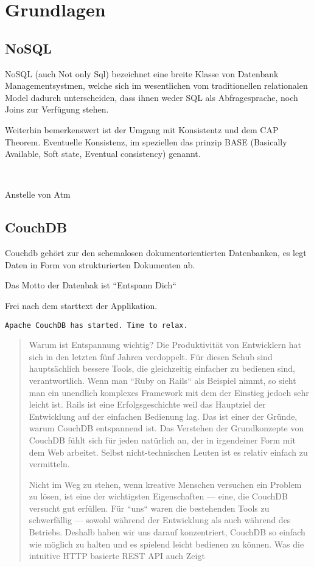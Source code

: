 \chapter{Grundlagen}

\section{NoSQL}


NoSQL (auch Not only Sql) bezeichnet eine breite Klasse
von Datenbank Managementsystmen, welche sich im wesentlichen
vom traditionellen relationalen Model dadurch unterscheiden,
dass ihnen weder SQL als Abfragesprache, noch Joins zur Verfügung stehen.
~ \cite{wikipedia:nosql}


Weiterhin bemerkenswert ist der Umgang mit Konsistentz und dem CAP Theorem.
Eventuelle Konsistenz, im speziellen das prinzip BASE (Basically Available, Soft state, Eventual consistency) genannt.

~ \cite{wikipedia:base}

Anstelle von Atm



\section{CouchDB}

Couchdb gehört zur den schemalosen dokumentorientierten Datenbanken,
es legt Daten in Form von strukturierten Dokumenten ab.

Das Motto der Datenbak ist ``Entspann Dich``

Frei nach dem starttext der Applikation.

\begin{verbatim}
Apache CouchDB has started. Time to relax.
\end{verbatim}


\begin{quote}
Warum ist Entspannung wichtig? Die Produktivität von Entwicklern hat sich in den letzten fünf Jahren verdoppelt.
Für diesen Schub sind hauptsächlich bessere Tools, die gleichzeitig einfacher zu bedienen sind, verantwortlich.
Wenn man ``Ruby on Rails`` als Beispiel nimmt, so sieht man ein unendlich komplexes Framework mit dem der Einstieg jedoch sehr leicht ist.
Rails ist eine Erfolgsgeschichte weil das Hauptziel der Entwicklung auf der einfachen Bedienung lag.
Das ist einer der Gründe, warum CouchDB entspannend ist.
Das Verstehen der Grundkonzepte von CouchDB fühlt sich für jeden natürlich an, der in irgendeiner Form mit dem Web arbeitet.
Selbst nicht-technischen Leuten ist es relativ einfach zu vermitteln.

Nicht im Weg zu stehen, wenn kreative Menschen versuchen ein Problem zu lösen, ist eine der wichtigsten Eigenschaften — eine,
die CouchDB versucht gut erfüllen. Für ``uns`` waren die bestehenden Tools zu schwerfällig — sowohl während der Entwicklung
als auch während des Betriebs. Deshalb haben wir uns darauf konzentriert,
CouchDB so einfach wie möglich zu halten und es spielend leicht bedienen zu können.
Was die intuitive HTTP basierte REST API auch Zeigt
\end{quote}
\cite[Deutsche Einführung]{couchdb:guide}


